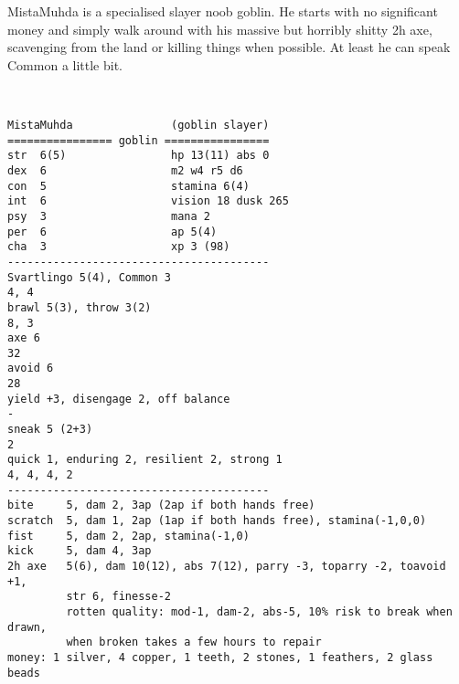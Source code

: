 \clearpage
\begin{samepage}

\noindent MistaMuhda is a specialised slayer noob goblin. He starts with no significant money and simply walk around with his massive but horribly shitty 2h axe, scavenging from the land or killing things when possible. At least he can speak Common a little bit.

\

\small \begin{verbatim}
MistaMuhda               (goblin slayer)
================ goblin ================
str  6(5)                hp 13(11) abs 0
dex  6                   m2 w4 r5 d6
con  5                   stamina 6(4)
int  6                   vision 18 dusk 265
psy  3                   mana 2
per  6                   ap 5(4)
cha  3                   xp 3 (98)
----------------------------------------
Svartlingo 5(4), Common 3                                                   4, 4
brawl 5(3), throw 3(2)                                                      8, 3
axe 6                                                                         32
avoid 6                                                                       28
yield +3, disengage 2, off balance                                             -
sneak 5 (2+3)                                                                  2
quick 1, enduring 2, resilient 2, strong 1                            4, 4, 4, 2
----------------------------------------
bite     5, dam 2, 3ap (2ap if both hands free)
scratch  5, dam 1, 2ap (1ap if both hands free), stamina(-1,0,0)
fist     5, dam 2, 2ap, stamina(-1,0)
kick     5, dam 4, 3ap
2h axe   5(6), dam 10(12), abs 7(12), parry -3, toparry -2, toavoid +1,
         str 6, finesse-2
         rotten quality: mod-1, dam-2, abs-5, 10% risk to break when drawn,
         when broken takes a few hours to repair
money: 1 silver, 4 copper, 1 teeth, 2 stones, 1 feathers, 2 glass beads
\end{verbatim} \end{samepage} \normalsize

\



